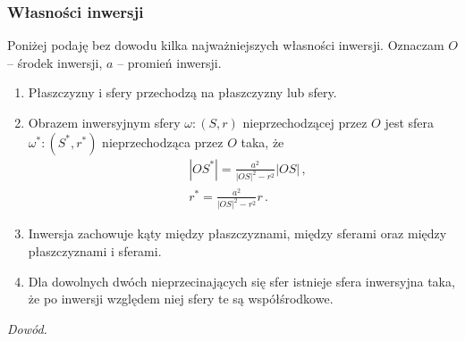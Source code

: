 \documentclass[../main.tex]{subfiles}
\begin{document}
\subsubsection*{Własności inwersji}
Poniżej podaję bez dowodu kilka najważniejszych własności inwersji. Oznaczam \(O\) -- środek
inwersji, \(a\) -- promień inwersji.
\begin{enumerate}
    \item Płaszczyzny i sfery przechodzą na płaszczyzny lub sfery.
    \item Obrazem inwersyjnym sfery \(\omega:(S,r)\) nieprzechodzącej przez \(O\) jest sfera
    \(\omega^*:(S^*,r^*)\) nieprzechodząca przez \(O\) taka, że
    \begin{equation*}
    \begin{split}
        &|OS^*|=\frac{a^2}{|OS|^2-r^2}|OS|\,,\\
        &r^*=\frac{a^2}{|OS|^2-r^2}r\,.
    \end{split}
    \end{equation*}

    \item Inwersja zachowuje kąty między płaszczyznami, między sferami oraz między płaszczyznami i
    sferami.
    
    \item Dla dowolnych dwóch nieprzecinających się sfer istnieje sfera inwersyjna taka, że po
    inwersji względem niej sfery te są współśrodkowe.

\end{enumerate}
\noindent{}
\medskip

\noindent\textit{Dowód.}
\medskip
\end{document}
